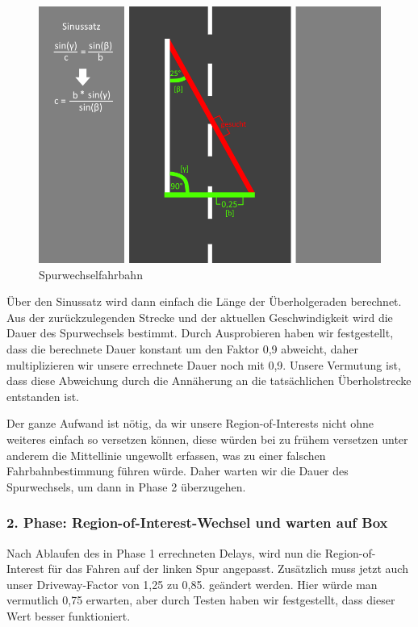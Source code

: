 \begin{figure}[H]
	\centering	
	\includegraphics[width=.8\textwidth]{img/ueberholen}
	\caption[Spurwechselfahrbahn]{Spurwechselfahrbahn}
	\label{fig:ueberholen}
\end{figure}

Über den Sinussatz wird dann einfach die Länge der Überholgeraden berechnet. Aus der zurückzulegenden Strecke und der aktuellen Geschwindigkeit wird die Dauer des Spurwechsels bestimmt. Durch Ausprobieren haben wir festgestellt, dass die berechnete Dauer konstant um den Faktor 0,9 abweicht, daher multiplizieren wir unsere errechnete Dauer noch mit 0,9. Unsere Vermutung ist, dass diese Abweichung durch die Annäherung an die tatsächlichen Überholstrecke entstanden ist.

Der ganze Aufwand ist nötig, da wir unsere Region-of-Interests nicht ohne weiteres einfach so versetzen können, diese würden bei zu frühem versetzen unter anderem die Mittellinie ungewollt erfassen, was zu einer falschen Fahrbahnbestimmung führen würde. Daher warten wir die Dauer des Spurwechsels, um dann in Phase 2 überzugehen.

\subsubsection{2. Phase: Region-of-Interest-Wechsel und warten auf Box}
Nach Ablaufen des in Phase 1 errechneten Delays, wird nun die Region-of-Interest für das Fahren auf der linken Spur angepasst. Zusätzlich muss jetzt auch unser Driveway-Factor von 1,25 zu 0,85. geändert werden. Hier würde man vermutlich 0,75 erwarten, aber durch Testen haben wir festgestellt, dass dieser Wert besser funktioniert.


